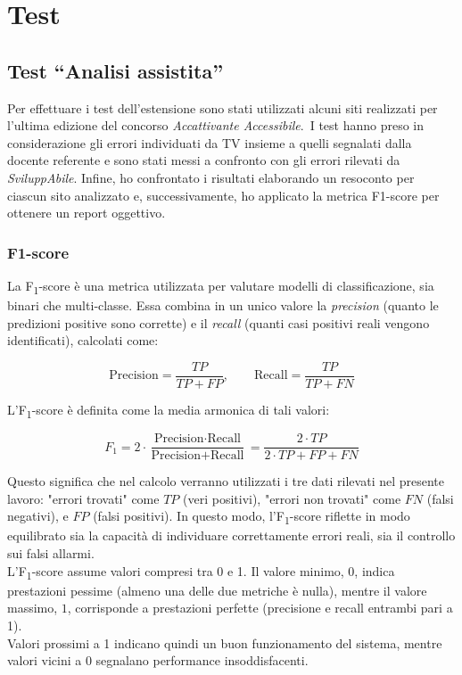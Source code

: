 \chapter{Test}
\label{chap:test}

\section{Test ``Analisi assistita''}
\noindent Per effettuare i test dell’estensione sono stati utilizzati alcuni siti realizzati per l’ultima edizione del concorso \textit{Accattivante Accessibile}.\
I test hanno preso in considerazione gli errori individuati da TV insieme a quelli segnalati dalla docente referente e sono stati messi a confronto con gli errori rilevati da \textit{SviluppAbile}.
Infine, ho confrontato i risultati elaborando un resoconto per ciascun sito analizzato e, successivamente, ho applicato la metrica F1-score per ottenere un report oggettivo.

\subsection{F1-score}
\noindent La F\textsubscript{1}-score è una metrica utilizzata per valutare modelli di classificazione, sia binari che multi‐classe. Essa combina in un unico valore la \textit{precision} (quanto le predizioni positive sono corrette) e il \textit{recall} (quanti casi positivi reali vengono identificati), calcolati come:

\[
\text{Precision} = \frac{TP}{TP + FP}, 
\qquad
\text{Recall} = \frac{TP}{TP + FN}
\]

\vspace{0.5cm}
\noindent L’F\textsubscript{1}-score è definita come la media armonica di tali valori:

\[
F_{1} = 2 \cdot \frac{\text{Precision} \cdot \text{Recall}}{\text{Precision} + \text{Recall}}
 = \frac{2 \cdot TP}{2 \cdot TP + FP + FN}
\]
\vspace{0.1cm}

\noindent Questo significa che nel calcolo verranno utilizzati i tre dati rilevati nel presente lavoro:
"errori trovati" come \(TP\) (veri positivi), "errori non trovati" come \(FN\) (falsi negativi), e \(FP\) (falsi positivi).
In questo modo, l’F\textsubscript{1}-score riflette in modo equilibrato sia la capacità di individuare correttamente errori reali, sia il controllo sui falsi allarmi.\\

\noindent L’F\textsubscript{1}-score assume valori compresi tra 0 e 1. Il valore minimo, \(0\), indica prestazioni pessime (almeno una delle due metriche è nulla), mentre il valore massimo, \(1\), corrisponde a prestazioni perfette (precisione e recall entrambi pari a 1).\\
Valori prossimi a 1 indicano quindi un buon funzionamento del sistema, mentre valori vicini a 0 segnalano performance insoddisfacenti.


